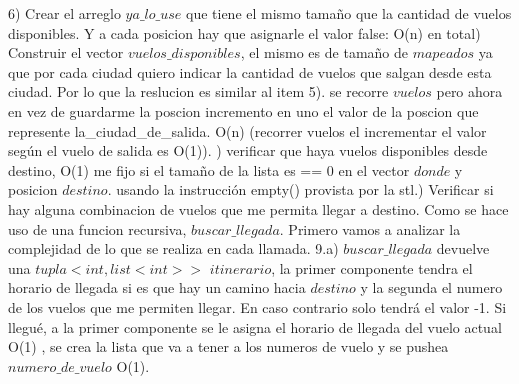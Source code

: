 \documentclass{article}
\begin{document}
6) Crear el arreglo $ya\_lo\_use$ que tiene el mismo tamaño que la cantidad de vuelos disponibles. Y a cada posicion hay que asignarle el valor false: O(n) en total) Construir el vector $vuelos\_disponibles$, el mismo es de tamaño de $mapeados$ ya que por cada  ciudad quiero indicar la cantidad de vuelos que salgan desde esta ciudad. Por lo que la reslucion es similar al item 5). se recorre $vuelos$ pero ahora en vez de guardarme la poscion incremento en uno el valor de la poscion que represente la\_ciudad\_de\_salida. O(n) (recorrer vuelos el incrementar el valor según el vuelo de salida es O(1)).  ) verificar que haya vuelos disponibles desde destino, O(1) me fijo si el tamaño de la lista es == 0 en el vector $donde$ y posicion $destino$. usando la instrucción empty() provista por la stl.) Verificar si hay alguna combinacion de vuelos que me permita llegar a destino. Como se hace uso de una funcion recursiva, $buscar\_llegada$. Primero vamos a analizar la complejidad de lo que se realiza en cada llamada.\newline
9.a) $buscar\_llegada$ devuelve una $tupla<int, list<int>>$ $itinerario$, la primer componente tendra el horario de llegada si es que hay un camino hacia $destino$ y la segunda el numero de los vuelos que me permiten llegar. En caso contrario solo tendrá el valor -1.  Si llegué, a la primer componente se le asigna el horario de llegada del vuelo actual O(1) , se crea la lista que va a tener a los numeros de vuelo y se pushea $numero\_de\_vuelo$ O(1).\newline
\end{document}
